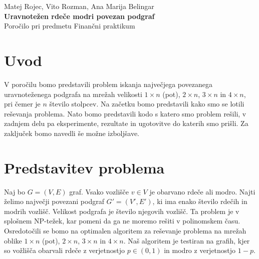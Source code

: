 \documentclass[a4paper, 11pt]{article}
\theoremstyle{definition}
\theoremstyle{definition}
\begin{document}
    
\thispagestyle{empty}
\vfill

\begin{center}{\large
Matej Rojec, Vito Rozman, Ana Marija Belingar  \\[2mm]
{\textbf{Uravnotežen rdeče modri povezan podgraf} }\\[10mm]
Poročilo pri predmetu Finančni praktikum \\[1cm]}
\end{center}
\vfill


\newpage




    \tableofcontents
    \listoffigures
    \listoftables

    \newpage
    
    \section{Uvod}

    V poročilu bomo predstavili problem iskanja največjega povezanega 
    uravnoteženega podgrafa na mrežah velikosti $1 \times n$ (pot), $2\times n$, $3\times n$ in 
    $4\times n$, pri čemer je $n$ število stolpcev. Na začetku bomo predstavili 
    kako smo se lotili reševanja problema. Nato bomo predstavili kodo s 
    katero smo problem rešili, v zadnjem delu pa eksperimente, rezultate 
    in ugotovitve do katerih smo prišli. Za zaključek bomo navedli še 
    možne izboljšave.

    \section{Predstavitev problema}
        
    Naj bo $G = (V, E)$ graf. Vsako vozlišče $v \in V $ je obarvano rdeče ali modro. 
    Najti želimo največji povezani podgraf $G' = (V', E')$, ki ima enako število rdečih in modrih vozlišč.
    Velikost podgrafa je število njegovih vozlišč. Ta problem je v splošnem NP-težek, kar pomeni da ga ne moremo
    rešiti v polinomskem času.
    Osredotočili se bomo na optimalen algoritem za reševanje problema na mrežah oblike $1 \times n$ (pot), $2 \times n$, 
    $3 \times n$ in $4 \times n$.
    Naš algoritem je testiran na grafih, kjer so vožlišča obarvali rdeče z verjetnostjo $p \in (0,1)$ 
    in modro z verjetnostjo $1 - p$. 
    
\end{document}
